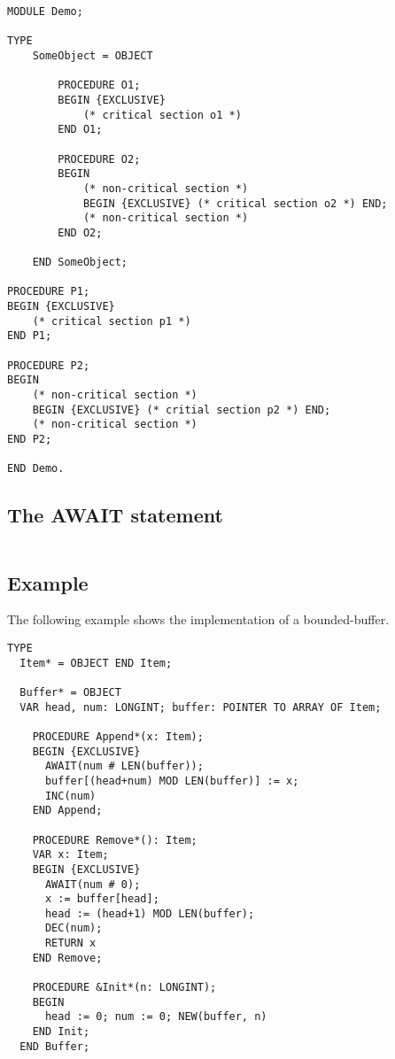 \documentclass[a4paper,11pt]{article}
\begin{document}
\begin{lstlisting}[language=Oberon,frame=none]
MODULE Demo;

TYPE
    SomeObject = OBJECT

        PROCEDURE O1;
        BEGIN {EXCLUSIVE}
            (* critical section o1 *)
        END O1;

        PROCEDURE O2;
        BEGIN
            (* non-critical section *)
            BEGIN {EXCLUSIVE} (* critical section o2 *) END;
            (* non-critical section *)
        END O2;

    END SomeObject;

PROCEDURE P1;
BEGIN {EXCLUSIVE}
    (* critical section p1 *)
END P1;

PROCEDURE P2;
BEGIN
    (* non-critical section *)
    BEGIN {EXCLUSIVE} (* critial section p2 *) END;
    (* non-critical section *)
END P2;

END Demo.
\end{lstlisting}

\subsection{The AWAIT statement}


\begin{lstlisting}[language=Oberon,frame=none]

\end{lstlisting}

\subsection{Example}
The following example shows the implementation of a bounded-buffer.

\begin{lstlisting}[language=Oberon,frame=none]
TYPE
  Item* = OBJECT END Item;
	
  Buffer* = OBJECT
  VAR head, num: LONGINT; buffer: POINTER TO ARRAY OF Item;
		
    PROCEDURE Append*(x: Item);
    BEGIN {EXCLUSIVE}
      AWAIT(num # LEN(buffer));
      buffer[(head+num) MOD LEN(buffer)] := x;
      INC(num)
    END Append;

    PROCEDURE Remove*(): Item;
    VAR x: Item;
    BEGIN {EXCLUSIVE}
      AWAIT(num # 0);
      x := buffer[head];
      head := (head+1) MOD LEN(buffer);
      DEC(num);
      RETURN x
    END Remove;

    PROCEDURE &Init*(n: LONGINT);
    BEGIN
      head := 0; num := 0; NEW(buffer, n)
    END Init;
  END Buffer;

\end{lstlisting}
\end{document}
